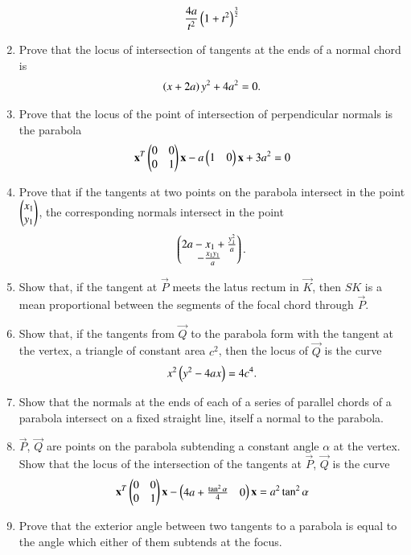 \begin{enumerate}[label=\arabic*.,ref=\thesubsection.\theenumi]
\begin{align}
\frac{4a}{t^2}\left(1+t^2\right)^{\frac{3}{2}}
\end{align}
\item Prove that the locus of intersection of tangents at the ends of a normal
chord is
\begin{align}
\left(x+2a\right)y^2+4a^2=0.
\end{align}
\item Prove that the locus of the point of intersection of perpendicular normals
is the parabola 
\begin{align}
\mathbf{x}^T\begin{pmatrix}0 & 0\\0 & 1\end{pmatrix}\mathbf{x}-a\begin{pmatrix}1 & 0 \end{pmatrix}\mathbf{x}+ 3a^2 =0
\end{align}
\item Prove that if the tangents at two points on the parabola intersect in
the point $\begin{pmatrix}x_1\\y_1\end{pmatrix}$, the corresponding normals intersect in the
point 
\begin{align}
\begin{pmatrix}2a-x_1+\frac{y_1^2}{a}\\-\frac{x_1y_1}{a}\end{pmatrix}.
\end{align}
\item Show that, if the tangent at $\vec{P}$ meets the latus rectum in $\vec{K}$, then $SK$ is a mean
proportional between the segments of the focal chord through $\vec{P}$.
\item Show that, if the tangents from $\vec{Q}$ to the parabola form with the tangent at the vertex,
a triangle of constant area $c^2$, then the locus
of $\vec{Q}$ is the curve
\begin{align}
x^2\left(y^2-4ax\right) = 4c^4.
\end{align}
\item Show that the normals at the ends of each of a series of parallel chords of a parabola intersect
on a fixed straight line, itself a normal to the parabola.
\item $\vec{P}$, $\vec{Q}$ are points on the parabola subtending a constant angle
$\alpha$ at the vertex.  Show that the locus of the intersection of the tangents
at $\vec{P}$, $\vec{Q}$ is the curve 
\begin{align}
\mathbf{x}^T\begin{pmatrix}0 & 0\\0 & 1\end{pmatrix}\mathbf{x}-\begin{pmatrix}4a + \frac{\tan^2\alpha}{4} & 0 \end{pmatrix}\mathbf{x}= a^2\tan^2\alpha 
\end{align}
\item Prove that the exterior angle between two tangents to a parabola is equal to the
angle which either of them subtends at the focus.

\end{enumerate}
